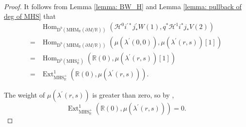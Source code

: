 \documentclass[11pt, a4paper]{amsart}
\theoremstyle{plain}
\theoremstyle{definition}
\numberwithin{equation}{section}
\def\RR{\mathbb{R}}
\DeclareMathOperator{\Hom}{Hom}
\DeclareMathOperator{\Ext}{Ext}
\begin{document}
\begin{proof}
It follows from Lemma \ref{lemma: BW_H} and Lemma \ref{lemma: pullback of deg of MHS} that
\begin{align*}
    & \Hom_{\mathrm{D}^{b}(\mathrm{MHM}_{\RR}(\partial M / \RR))}(\mathcal{H}^{0}i^{\prime*}j_{*}^{\prime}W(1), q^{*}\mathcal{H}^{1}i^{*}j_{*}V(2))  \\ 
    = & \Hom_{\mathrm{D}^{b}(\mathrm{MHM}_{\RR}(\partial M / \RR))}(\mu(\lambda^{\prime}(0, 0)), \mu(\lambda^{\prime}(r, s))[1]) \\
    = & \Hom_{\mathrm{D}^{b}(\mathrm{MHS}_{\RR}^{+})}(\RR(0), \mu(\lambda^{\prime}(r, s))[1])  \\
    = & \Ext^{1}_{\mathrm{MHS}_{\RR}^{+}}(\RR(0), \mu(\lambda^{\prime}(r, s))). 
\end{align*}

The weight of $\mu(\lambda^{\prime}(r, s))$ is greater than zero,  so by \cite[Theorem A.2.10]{HW98}, 
\begin{equation*}
    \Ext^{1}_{\mathrm{MHS}_{\RR}^{+}}(\RR(0), \mu(\lambda^{\prime}(r, s))) = 0. 
\end{equation*}
\end{proof}
        
\end{document}
